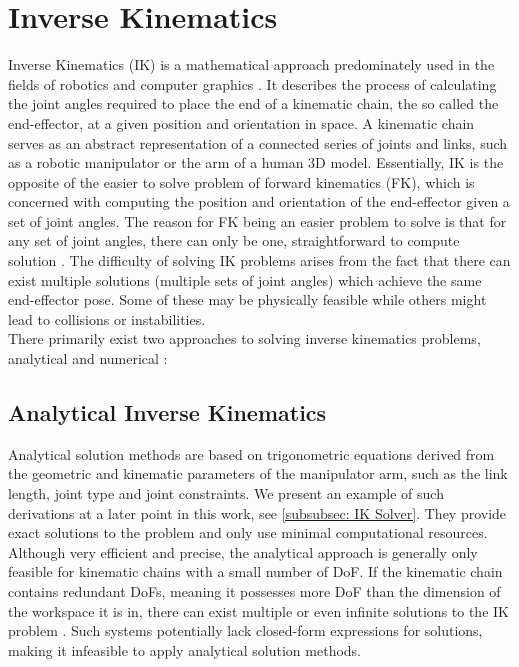 \section{Inverse Kinematics}
Inverse Kinematics (IK) is a mathematical approach predominately used in the fields of robotics and computer graphics \parencite{AristidouFABRIK}.
It describes the process of calculating the joint angles required to place the end of a kinematic chain, the so called the end-effector, at a given position and orientation in space.
A kinematic chain serves as an abstract representation of a connected series of joints and links, such as a robotic manipulator or the arm of a human 3D model.
Essentially, IK is the opposite of the easier to solve problem of forward kinematics (FK), which is concerned with computing the position and orientation of the end-effector given a set of joint angles.
The reason for FK being an easier problem to solve is that for any set of joint angles, there can only be one, straightforward to compute solution \parencite{inverseKinematicsIllinois}.
The difficulty of solving IK problems arises from the fact that there can exist multiple solutions (multiple sets of joint angles) which achieve the same end-effector pose.
Some of these may be physically feasible while others might lead to collisions or instabilities.\\
There primarily exist two approaches to solving inverse kinematics problems, analytical and numerical \parencite{inverseKinematicsIllinois}:

\subsection{Analytical Inverse Kinematics}
Analytical solution methods are based on trigonometric equations derived from the geometric and kinematic parameters of the manipulator arm, such as the link length, joint type and joint constraints.
We present an example of such derivations at a later point in this work, see \ref{subsubsec: IK Solver}.
They provide exact solutions to the problem and only use minimal computational resources.
Although very efficient and precise, the analytical approach is generally only feasible for kinematic chains with a small number of DoF.
If the kinematic chain contains redundant DoFs, meaning it possesses more DoF than the dimension of the workspace it is in, there can exist multiple or even infinite solutions to the IK problem \parencite{inverseKinematicsIllinois}.
Such systems potentially lack closed-form expressions for solutions, making it infeasible to apply analytical solution methods.

